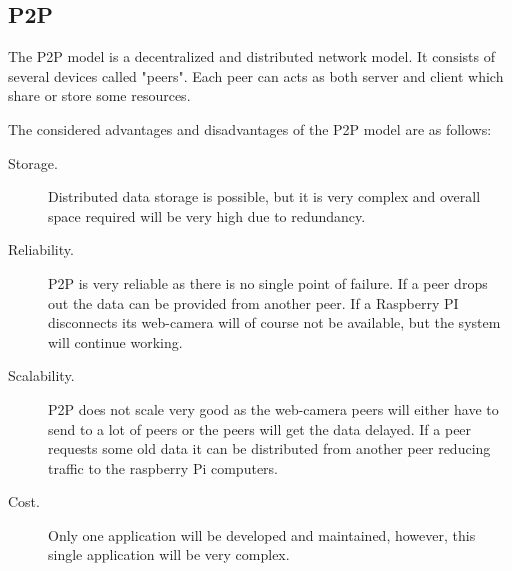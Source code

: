 \subsection{P2P}
The P2P model is a decentralized and distributed network model. It consists of several devices called "peers". Each peer can acts as both server and client which share or store some resources.

The considered advantages and disadvantages of the P2P model are as follows:

\begin{description}
\item[Storage.] Distributed data storage is possible, but it is very complex and overall space required will be very high due to redundancy.

\item[Reliability.] P2P is very reliable as there is no single point of failure. If a peer drops out the data can be provided from another peer. If a Raspberry PI disconnects its web-camera will of course not be available, but the system will continue working.

\item[Scalability.] P2P does not scale very good as the web-camera peers will either have to send to a lot of peers or the peers will get the data delayed. If a peer requests some old data it can be distributed from another peer reducing traffic to the raspberry Pi computers.

\item[Cost.] Only one application will be developed and maintained, however, this single application will be very complex.
\end{description}

